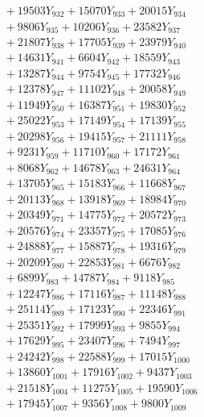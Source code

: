 \documentclass[a4paper,10pt]{article}
\begin{document}
{\begin{align}
&\;  + 19503 Y_{932} + 15070 Y_{933} + 20015 Y_{934} \\[0.3ex]
&\;  + 9806 Y_{935} + 10206 Y_{936} + 23582 Y_{937} \\[0.3ex]
&\;  + 21807 Y_{938} + 17705 Y_{939} + 23979 Y_{940} \\[0.3ex]
&\;  + 14631 Y_{941} + 6604 Y_{942} + 18559 Y_{943} \\[0.3ex]
&\;  + 13287 Y_{944} + 9754 Y_{945} + 17732 Y_{946} \\[0.3ex]
&\;  + 12378 Y_{947} + 11102 Y_{948} + 20058 Y_{949} \\[0.3ex]
&\;  + 11949 Y_{950} + 16387 Y_{951} + 19830 Y_{952} \\[0.3ex]
&\;  + 25022 Y_{953} + 17149 Y_{954} + 17139 Y_{955} \\[0.3ex]
&\;  + 20298 Y_{956} + 19415 Y_{957} + 21111 Y_{958} \\[0.5ex]\allowbreak
&\;  + 9231 Y_{959} + 11710 Y_{960} + 17172 Y_{961} \\[0.3ex]
&\;  + 8068 Y_{962} + 14678 Y_{963} + 24631 Y_{964} \\[0.3ex]
&\;  + 13705 Y_{965} + 15183 Y_{966} + 11668 Y_{967} \\[0.3ex]
&\;  + 20113 Y_{968} + 13918 Y_{969} + 18984 Y_{970} \\[0.3ex]
&\;  + 20349 Y_{971} + 14775 Y_{972} + 20572 Y_{973} \\[0.3ex]
&\;  + 20576 Y_{974} + 23357 Y_{975} + 17085 Y_{976} \\[0.3ex]
&\;  + 24888 Y_{977} + 15887 Y_{978} + 19316 Y_{979} \\[0.3ex]
&\;  + 20209 Y_{980} + 22853 Y_{981} + 6676 Y_{982} \\[0.3ex]
&\;  + 6899 Y_{983} + 14787 Y_{984} + 9118 Y_{985} \\[0.3ex]
&\;  + 12247 Y_{986} + 17116 Y_{987} + 11148 Y_{988} \\[0.5ex]\allowbreak
&\;  + 25114 Y_{989} + 17123 Y_{990} + 22346 Y_{991} \\[0.3ex]
&\;  + 25351 Y_{992} + 17999 Y_{993} + 9855 Y_{994} \\[0.3ex]
&\;  + 17629 Y_{995} + 23407 Y_{996} + 7494 Y_{997} \\[0.3ex]
&\;  + 24242 Y_{998} + 22588 Y_{999} + 17015 Y_{1000} \\[0.3ex]
&\;  + 13860 Y_{1001} + 17916 Y_{1002} + 9437 Y_{1003} \\[0.3ex]
&\;  + 21518 Y_{1004} + 11275 Y_{1005} + 19590 Y_{1006} \\[0.3ex]
&\;  + 17945 Y_{1007} + 9356 Y_{1008} + 9800 Y_{1009} \\[0.3ex]

\end{align}}
\end{document}
